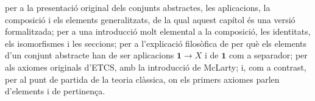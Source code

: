 \begin{resumcap}
 \cite[cap.~1]{lawvere-rosebrugh} per a la presentació original dels conjunts abstractes, les aplicacions, la composició i els elements generalitzats, de la qual aquest capítol és una versió formalitzada; \cite[sessions~1--5]{lawvere-schanuel} per a una introducció molt elemental a la composició, les identitats, els isomorfismes i les seccions; \cite[pàg.~10--11]{bell2006} per a l'explicació filosòfica de per què els elements d'un conjunt abstracte han de ser aplicacions \(\mathbf1\to X\) i de \(\mathbf1\) com a separador; \cite{lawvere-etcs-reprint} per als axiomes originals d'ETCS, amb la introducció de McLarty; i, com a contrast, \cite[§§1--3]{halmos} per al punt de partida de la teoria clàssica, on els primers axiomes parlen d'elements i de pertinença.
\end{resumcap}


